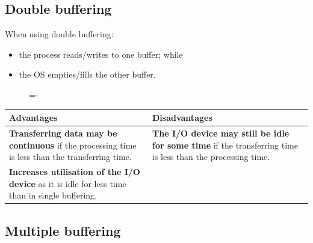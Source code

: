 \documentclass[a4paper]{systems-software}
\begin{document}
\subsection*{Double buffering}

When using double buffering:
\begin{itemize}
	\item the process reads/writes to one buffer; while
	\item the OS empties/fills the other buffer.
\end{itemize}

\begin{figure}[H]
  \lineskip=-\fboxrule
\end{figure}

\newpage

\begin{longtabu} to \textwidth {| X[1,l] | X[1,l] |}
    \hline
    \textbf{Advantages} & \textbf{Disadvantages}
	\\ \hline
	\textbf{Transferring data may be continuous} if the processing time is less than the transferring time. &
	\textbf{The I/O device may still be idle for some time} if the transferring time is less than the processing time.
	\\ \hline
	\textbf{Increases utilisation of the I/O device} as it is idle for less time than in single buffering. &
	\\ \hline
\end{longtabu}


\subsection*{Multiple buffering}
\end{document}

